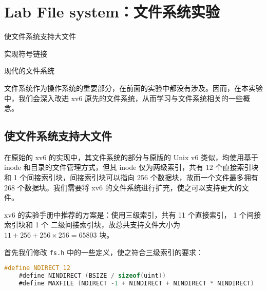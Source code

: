 \chapter{Lab File system：文件系统实验}
\begin{introduction}
    \item 使文件系统支持大文件
    \item 实现符号链接
    \item 现代的文件系统
\end{introduction}

文件系统作为操作系统的重要部分，在前面的实验中都没有涉及。因而，在本实验中，我们会深入改进 xv6 原先的文件系统，从而学习与文件系统相关的一些概念。

\section{使文件系统支持大文件}

在原始的 xv6 的实现中，其文件系统的部分与原版的 Unix v6 类似，均使用基于 inode 和目录的文件管理方式，但其 inode 仅为两级索引，共有 12 个直接索引块和 1 个间接索引块，间接索引块可以指向 256 个数据块，故而一个文件最多拥有 268 个数据块。我们需要将 xv6 的文件系统进行扩充，使之可以支持更大的文件。

xv6 的实验手册中推荐的方案是：使用三级索引，共有 11 个直接索引， 1 个间接索引块和 1 个 二级间接索引块，故总共支持文件大小为 $11 + 256 + 256 \times 256 = 65803$ 块。

首先我们修改 \lstinline{fs.h} 中的一些定义，使之符合三级索引的要求：
\begin{lstlisting}[language=C]
    #define NDIRECT 12
    #define NINDIRECT (BSIZE / sizeof(uint))
    #define MAXFILE (NDIRECT -1 + NINDIRECT + NINDIRECT * NINDIRECT)
\end{lstlisting}

